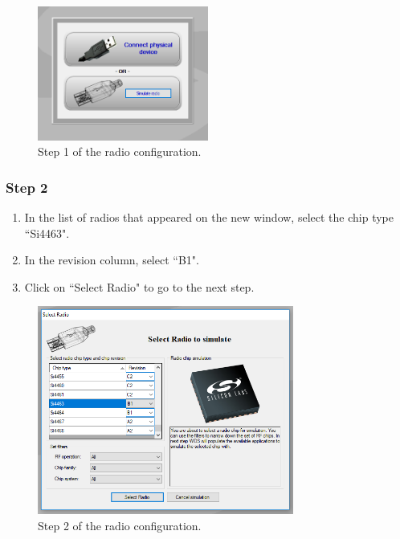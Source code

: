 \begin{figure}[!h]
	\begin{center}
		\includegraphics[width=0.5\textwidth]{figures/wds-tutorial-1.png}
		\caption{Step 1 of the radio configuration.}
		\label{fig:wds-tutorial-step-1}
	\end{center}
\end{figure}

\subsubsection{Step 2}

\begin{enumerate}
    \item In the list of radios that appeared on the new window, select the chip type ``Si4463".
    \item In the revision column, select ``B1".
    \item Click on ``Select Radio" to go to the next step.
\end{enumerate}

\begin{figure}[!h]
	\begin{center}
		\includegraphics[width=0.75\textwidth]{figures/wds-tutorial-2.png}
		\caption{Step 2 of the radio configuration.}
		\label{fig:wds-tutorial-step-2}
	\end{center}
\end{figure}

